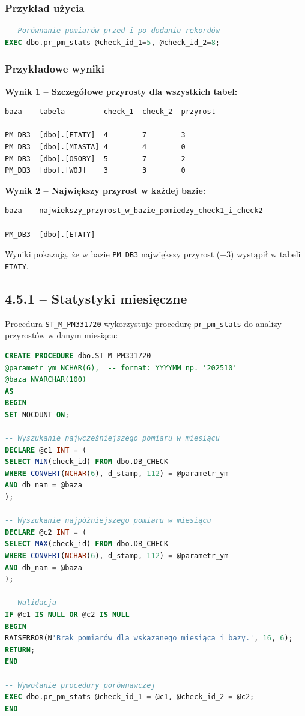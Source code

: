 \documentclass[a4paper,11pt]{article}
\begin{document}
	\subsubsection{Przykład użycia}
	
	\begin{lstlisting}[language=SQL]
-- Porównanie pomiarów przed i po dodaniu rekordów
EXEC dbo.pr_pm_stats @check_id_1=5, @check_id_2=8;
	\end{lstlisting}
	
	\subsubsection{Przykładowe wyniki}
	
	\textbf{Wynik 1 -- Szczegółowe przyrosty dla wszystkich tabel:}
	\begin{lstlisting}
baza    tabela         check_1  check_2  przyrost
------  -------------  -------  -------  --------
PM_DB3  [dbo].[ETATY]  4        7        3
PM_DB3  [dbo].[MIASTA] 4        4        0
PM_DB3  [dbo].[OSOBY]  5        7        2
PM_DB3  [dbo].[WOJ]    3        3        0
	\end{lstlisting}
	
	\textbf{Wynik 2 -- Największy przyrost w każdej bazie:}
	\begin{lstlisting}
baza    najwiekszy_przyrost_w_bazie_pomiedzy_check1_i_check2
------  -----------------------------------------------------
PM_DB3  [dbo].[ETATY]
	\end{lstlisting}
	
	Wyniki pokazują, że w bazie \texttt{PM\_DB3} największy przyrost (+3) wystąpił w tabeli \texttt{ETATY}.
	
	\subsection{4.5.1 -- Statystyki miesięczne}
	
	Procedura \texttt{ST\_M\_PM331720} wykorzystuje procedurę \texttt{pr\_pm\_stats} do analizy przyrostów w danym miesiącu:
	
	\begin{lstlisting}[language=SQL]
CREATE PROCEDURE dbo.ST_M_PM331720
@parametr_ym NCHAR(6),  -- format: YYYYMM np. '202510'
@baza NVARCHAR(100)
AS
BEGIN
SET NOCOUNT ON;
		
-- Wyszukanie najwcześniejszego pomiaru w miesiącu
DECLARE @c1 INT = (
SELECT MIN(check_id) FROM dbo.DB_CHECK 
WHERE CONVERT(NCHAR(6), d_stamp, 112) = @parametr_ym 
AND db_nam = @baza
);
		
-- Wyszukanie najpóźniejszego pomiaru w miesiącu
DECLARE @c2 INT = (
SELECT MAX(check_id) FROM dbo.DB_CHECK 
WHERE CONVERT(NCHAR(6), d_stamp, 112) = @parametr_ym 
AND db_nam = @baza
);
		
-- Walidacja
IF @c1 IS NULL OR @c2 IS NULL
BEGIN
RAISERROR(N'Brak pomiarów dla wskazanego miesiąca i bazy.', 16, 6);
RETURN;
END
		
-- Wywołanie procedury porównawczej
EXEC dbo.pr_pm_stats @check_id_1 = @c1, @check_id_2 = @c2;
END
	\end{lstlisting}
	
\end{document}
